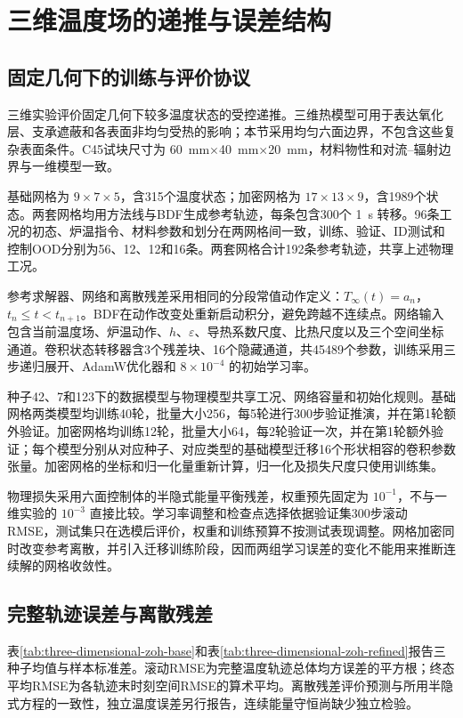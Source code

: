 \section{三维温度场的递推与误差结构}

\subsection{固定几何下的训练与评价协议}

三维实验评价固定几何下较多温度状态的受控递推。三维热模型可用于表达氧化层、支承遮蔽和各表面非均匀受热的影响\cite{yang2022reheating3d}；本节采用均匀六面边界，不包含这些复杂表面条件。C45试块尺寸为 \SI{60}{\milli\metre}$\times$\SI{40}{\milli\metre}$\times$\SI{20}{\milli\metre}，材料物性和对流--辐射边界与一维模型一致。

基础网格为 $9\times7\times5$，含315个温度状态；加密网格为 $17\times13\times9$，含1989个状态。两套网格均用方法线与BDF生成参考轨迹，每条包含300个 \SI{1}{\second} 转移。96条工况的初态、炉温指令、材料参数和划分在两网格间一致，训练、验证、ID测试和控制OOD分别为56、12、12和16条。两套网格合计192条参考轨迹，共享上述物理工况。

参考求解器、网络和离散残差采用相同的分段常值动作定义：$T_\infty(t)=a_n$，$t_n\le t<t_{n+1}$。BDF在动作改变处重新启动积分，避免跨越不连续点。网络输入包含当前温度场、炉温动作、$h$、$\varepsilon$、导热系数尺度、比热尺度以及三个空间坐标通道。卷积状态转移器含3个残差块、16个隐藏通道，共45489个参数，训练采用三步递归展开、AdamW优化器和 $8\times10^{-4}$ 的初始学习率。

种子42、7和123下的数据模型与物理模型共享工况、网络容量和初始化规则。基础网格两类模型均训练40轮，批量大小256，每5轮进行300步验证推演，并在第1轮额外验证。加密网格均训练12轮，批量大小64，每2轮验证一次，并在第1轮额外验证；每个模型分别从对应种子、对应类型的基础模型迁移16个形状相容的卷积参数张量。加密网格的坐标和归一化量重新计算，归一化及损失尺度只使用训练集。

物理损失采用六面控制体的半隐式能量平衡残差，权重预先固定为 $10^{-1}$，不与一维实验的 $10^{-3}$ 直接比较。学习率调整和检查点选择依据验证集300步滚动RMSE，测试集只在选模后评价，权重和训练预算不按测试表现调整。网格加密同时改变参考离散，并引入迁移训练阶段，因而两组学习误差的变化不能用来推断连续解的网格收敛性。

\subsection{完整轨迹误差与离散残差}

表\ref{tab:three-dimensional-zoh-base}和表\ref{tab:three-dimensional-zoh-refined}报告三种子均值与样本标准差。滚动RMSE为完整温度轨迹总体均方误差的平方根；终态平均RMSE为各轨迹末时刻空间RMSE的算术平均。离散残差评价预测与所用半隐式方程的一致性，独立温度误差另行报告，连续能量守恒尚缺少独立检验。

